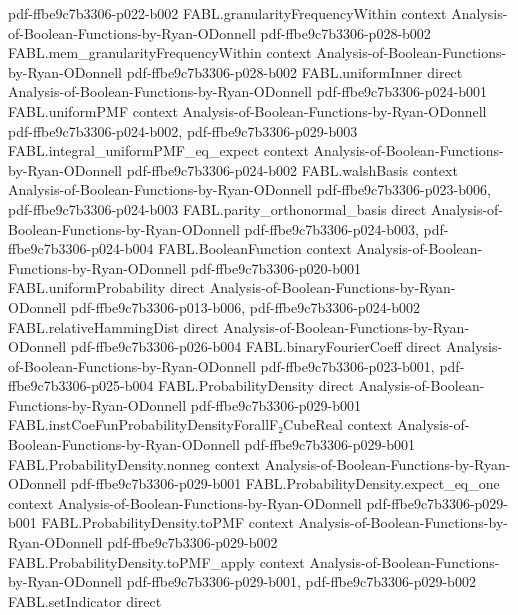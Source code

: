 \begin{theorem}
  {pdf-ffbe9c7b3306-p022-b002}
\proofstep
  {FABL.granularityFrequencyWithin}
  {context}
  {Analysis-of-Boolean-Functions-by-Ryan-ODonnell}
  {pdf-ffbe9c7b3306-p028-b002}
\proofstep
  {FABL.mem_granularityFrequencyWithin}
  {context}
  {Analysis-of-Boolean-Functions-by-Ryan-ODonnell}
  {pdf-ffbe9c7b3306-p028-b002}
\proofstep
  {FABL.uniformInner}
  {direct}
  {Analysis-of-Boolean-Functions-by-Ryan-ODonnell}
  {pdf-ffbe9c7b3306-p024-b001}
\proofstep
  {FABL.uniformPMF}
  {context}
  {Analysis-of-Boolean-Functions-by-Ryan-ODonnell}
  {pdf-ffbe9c7b3306-p024-b002,
    pdf-ffbe9c7b3306-p029-b003}
\proofstep
  {FABL.integral_uniformPMF_eq_expect}
  {context}
  {Analysis-of-Boolean-Functions-by-Ryan-ODonnell}
  {pdf-ffbe9c7b3306-p024-b002}
\proofstep
  {FABL.walshBasis}
  {context}
  {Analysis-of-Boolean-Functions-by-Ryan-ODonnell}
  {pdf-ffbe9c7b3306-p023-b006,
    pdf-ffbe9c7b3306-p024-b003}
\proofstep
  {FABL.parity_orthonormal_basis}
  {direct}
  {Analysis-of-Boolean-Functions-by-Ryan-ODonnell}
  {pdf-ffbe9c7b3306-p024-b003,
    pdf-ffbe9c7b3306-p024-b004}
\proofstep
  {FABL.BooleanFunction}
  {context}
  {Analysis-of-Boolean-Functions-by-Ryan-ODonnell}
  {pdf-ffbe9c7b3306-p020-b001}
\proofstep
  {FABL.uniformProbability}
  {direct}
  {Analysis-of-Boolean-Functions-by-Ryan-ODonnell}
  {pdf-ffbe9c7b3306-p013-b006,
    pdf-ffbe9c7b3306-p024-b002}
\proofstep
  {FABL.relativeHammingDist}
  {direct}
  {Analysis-of-Boolean-Functions-by-Ryan-ODonnell}
  {pdf-ffbe9c7b3306-p026-b004}
\proofstep
  {FABL.binaryFourierCoeff}
  {direct}
  {Analysis-of-Boolean-Functions-by-Ryan-ODonnell}
  {pdf-ffbe9c7b3306-p023-b001,
    pdf-ffbe9c7b3306-p025-b004}
\proofstep
  {FABL.ProbabilityDensity}
  {direct}
  {Analysis-of-Boolean-Functions-by-Ryan-ODonnell}
  {pdf-ffbe9c7b3306-p029-b001}
\proofstep
  {FABL.instCoeFunProbabilityDensityForallF₂CubeReal}
  {context}
  {Analysis-of-Boolean-Functions-by-Ryan-ODonnell}
  {pdf-ffbe9c7b3306-p029-b001}
\proofstep
  {FABL.ProbabilityDensity.nonneg}
  {context}
  {Analysis-of-Boolean-Functions-by-Ryan-ODonnell}
  {pdf-ffbe9c7b3306-p029-b001}
\proofstep
  {FABL.ProbabilityDensity.expect_eq_one}
  {context}
  {Analysis-of-Boolean-Functions-by-Ryan-ODonnell}
  {pdf-ffbe9c7b3306-p029-b001}
\proofstep
  {FABL.ProbabilityDensity.toPMF}
  {context}
  {Analysis-of-Boolean-Functions-by-Ryan-ODonnell}
  {pdf-ffbe9c7b3306-p029-b002}
\proofstep
  {FABL.ProbabilityDensity.toPMF_apply}
  {context}
  {Analysis-of-Boolean-Functions-by-Ryan-ODonnell}
  {pdf-ffbe9c7b3306-p029-b001,
    pdf-ffbe9c7b3306-p029-b002}
\proofstep
  {FABL.setIndicator}
  {direct}

\end{theorem}
